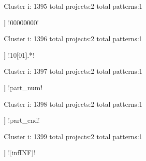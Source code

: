 Cluster i: 1395
total projects:2
total patterns:1
\begin{multicols}{1}
\begin{description}[noitemsep,topsep=0pt]
\item [[2] ] \cverb!00000000!
\end{description}
\end{multicols}







Cluster i: 1396
total projects:2
total patterns:1
\begin{multicols}{1}
\begin{description}[noitemsep,topsep=0pt]
\item [[2] ] \cverb!10[01].*!
\end{description}
\end{multicols}







Cluster i: 1397
total projects:2
total patterns:1
\begin{multicols}{1}
\begin{description}[noitemsep,topsep=0pt]
\item [[2] ] \cverb!part_num!
\end{description}
\end{multicols}







Cluster i: 1398
total projects:2
total patterns:1
\begin{multicols}{1}
\begin{description}[noitemsep,topsep=0pt]
\item [[2] ] \cverb!part_end!
\end{description}
\end{multicols}







Cluster i: 1399
total projects:2
total patterns:1
\begin{multicols}{1}
\begin{description}[noitemsep,topsep=0pt]
\item [[2] ] \cverb![infINF]!
\end{description}
\end{multicols}







